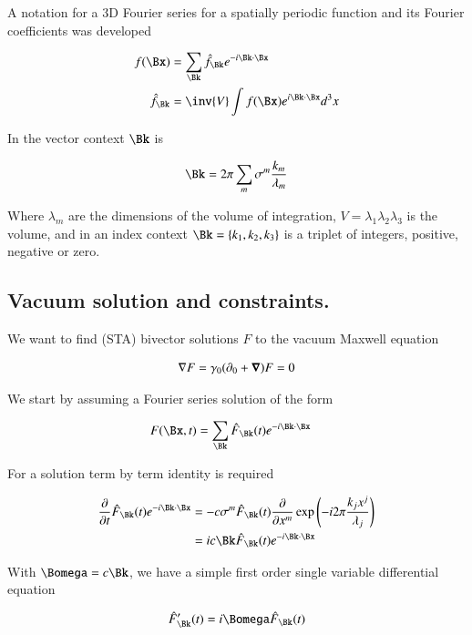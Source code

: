 A notation for a 3D Fourier series for a spatially periodic function and its Fourier coefficients was developed

\begin{align}
f(\Bx) &= \sum_{\Bk} \hat{f}_{\Bk} e^{ - i \Bk \cdot \Bx } \\
\hat{f}_{\Bk} &= \inv{V} \int f(\Bx) e^{ i \Bk \cdot \Bx } d^3 x
\end{align}

In the vector context $\Bk$ is

\begin{align}
\Bk = 2 \pi \sum_m \sigma^m \frac{k_m}{\lambda_m}
\end{align}

Where $\lambda_m$ are the dimensions of the volume of integration,
$V = \lambda_1 \lambda_2 \lambda_3$ is the volume, and
in an index context $\Bk = \{k_1, k_2, k_3\}$ is a triplet of integers,
positive, negative or zero.

\subsection{Vacuum solution and constraints. }

We want to find (STA) bivector solutions $F$ to the vacuum Maxwell equation

\begin{align}\label{eqn:planewave:maxwell}
\nabla F = \gamma_0 (\partial_0 + \boldsymbol{\nabla}) F = 0
\end{align}

We start by assuming a Fourier series solution of the form

\begin{align}
F(\Bx,t) &= \sum_{\Bk} \hat{F}_{\Bk}(t) e^{-i \Bk \cdot \Bx}
\end{align}

For a solution term by term identity is required

\begin{align*}
\PD{t}{} \hat{F}_{\Bk}(t) e^{-i \Bk \cdot \Bx}
&= -c \sigma^m \hat{F}_{\Bk}(t) \PD{x^m}{} \exp\left(-i 2 \pi \frac{k_j x^j}{ \lambda_j}\right) \\
&= i c \Bk \hat{F}_{\Bk}(t) e^{-i \Bk \cdot \Bx}
\end{align*}

With $\Bomega = c \Bk$, we have a simple first order single variable differential equation

\begin{align*}
\hat{F}_{\Bk}'(t) = i \Bomega \hat{F}_{\Bk}(t)
\end{align*}

